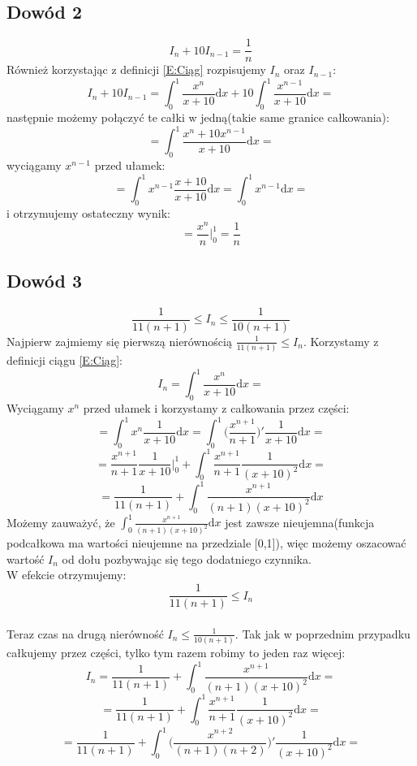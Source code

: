 \documentclass[11pt,leqno]{article}
\begin{document}
\subsection{Dowód 2}\label{SS:Dowód 2}
$$
    I_{n} + 10I_{n-1} = \frac{1}{n}
$$
Również korzystając z definicji \eqref{E:Ciąg} rozpisujemy $I_{n}$ oraz $I_{n-1}$:
$$
    I_{n} + 10I_{n-1} =
    \int_{0}^{1} \frac{x^n}{x+10} \mathrm{d}x + 10\int_{0}^{1} \frac{x^{n-1}}{x+10} \mathrm{d}x =
$$
następnie możemy połączyć te całki w jedną(takie same granice całkowania):
$$
    =
    \int_{0}^{1} \frac{x^n + 10x^{n-1}}{x+10} \mathrm{d}x =
$$
wyciągamy $x^{n-1}$ przed ułamek:
$$
    =
    \int_{0}^{1} x^{n-1}\frac{x + 10}{x + 10} \mathrm{d}x =
    \int_{0}^{1} x^{n-1} \mathrm{d}x =
$$
i otrzymujemy ostateczny wynik:
$$
    =
    \frac{x^n}{n} \Bigg|_{0}^{1} =
    \frac{1}{n}
$$
\subsection{Dowód 3}\label{SS:Dowód 3}
$$
    \frac{1}{11(n+1)} \leq I_{n} \leq \frac{1}{10(n+1)}
$$
Najpierw zajmiemy się pierwszą nierównością $\frac{1}{11(n+1)} \leq I_{n}$. Korzystamy z definicji ciągu \eqref{E:Ciąg}:
$$
    I_{n} =
    \int_{0}^{1} \frac{x^n}{x+10} \mathrm{d}x =
$$
Wyciągamy $x^n$ przed ułamek i korzystamy z całkowania przez części:
$$
    =
    \int_{0}^{1} x^n\frac{1}{x+10} \mathrm{d}x =
    \int_{0}^{1} \Bigg(\frac{x^{n+1}}{n+1}\Bigg)' \frac{1}{x+10} \mathrm{d}x =
$$
$$
    =
    \frac{x^{n+1}}{n+1}\frac{1}{x+10} \Bigg|_{0}^{1} + \int_{0}^{1} \frac{x^{n+1}}{n+1} \frac{1}{(x+10)^2} \mathrm{d}x =
$$
$$
    =
    \frac{1}{11(n+1)} + \int_{0}^{1} \frac{x^{n+1}}{(n+1)(x+10)^2} \mathrm{d}x
$$
Możemy zauważyć, że $\int_{0}^{1} \frac{x^{n+1}}{(n+1)(x+10)^2} \mathrm{d}x$ jest zawsze nieujemna(funkcja
podcałkowa ma wartości nieujemne na przedziale [0,1]), więc możemy oszacować wartość $I_{n}$ od dołu
pozbywając się tego dodatniego czynnika. \\ W efekcie otrzymujemy:
$$
    \frac{1}{11(n+1)} \leq I_{n}
$$ \\
Teraz czas na drugą nierówność $I_{n} \leq \frac{1}{10(n+1)}$.
Tak jak w poprzednim przypadku całkujemy przez części, tylko tym razem robimy to jeden raz więcej:
$$
    I_{n} =
    \frac{1}{11(n+1)} + \int_{0}^{1} \frac{x^{n+1}}{(n+1)(x+10)^2} \mathrm{d}x =
$$
$$
    =
    \frac{1}{11(n+1)} + \int_{0}^{1} \frac{x^{n+1}}{n+1}\frac{1}{(x+10)^2} \mathrm{d}x =
$$
$$
    =
    \frac{1}{11(n+1)} + \int_{0}^{1} \Bigg(\frac{x^{n+2}}{(n+1)(n+2)}\Bigg)'\frac{1}{(x+10)^2} \mathrm{d}x =
$$
\end{document}
